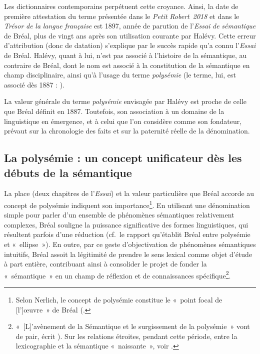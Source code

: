 \documentclass[output=paper]{langsci/langscibook}
\begin{document}
Les dictionnaires contemporains perpétuent cette croyance. Ainsi, la date de première attestation du terme présentée dans le \textit{Petit} \textit{Robert~2018} et dans le \textit{Trésor} \textit{de} \textit{la} \textit{langue} \textit{française} est 1897, année de parution de l’\textit{Essai} \textit{de} \textit{sémantique} de Bréal, plus de vingt ans après son utilisation courante par Halévy. Cette erreur d’attribution (donc de datation) s’explique par le succès rapide qu’a connu l’\textit{Essai} de Bréal. Halévy, quant à lui, n’est pas associé à l’histoire de la sémantique, au contraire de Bréal, dont le nom est associé à la constitution de la sémantique en champ disciplinaire, ainsi qu’à l’usage du terme \textit{polysémie} (le terme, lui, est associé dès 1887 : \citealt{baale_bulletin_1887}).

La valeur générale du terme \textit{polysémie} envisagée par Halévy est proche de celle que Bréal définit en 1887. Toutefois, son association à un domaine de la linguistique en émergence, et à celui que l’on considère comme son fondateur, prévaut sur la chronologie des faits et sur la paternité réelle de la dénomination.

\subsection{La polysémie : un concept unificateur dès les débuts de la sémantique}

La place (deux chapitres de l’\textit{Essai}) et la valeur particulière que Bréal accorde au concept de polysémie indiquent son importance\footnote{ \textrm{Selon Nerlich, le concept de polysémie constitue le «~point focal de [l’]œuvre~» de Bréal (\citealt[22]{nerlich_avant-propos_1993}.}}. En utilisant une dénomination simple pour parler d’un ensemble de phénomènes sémantiques relativement complexes, Bréal souligne la puissance significative des formes linguistiques, qui résultent parfois d’une réduction (cf.~le rapport qu’établit Bréal entre polysémie et «~ellipse~»). En outre, par ce geste d’objectivation de phénomènes sémantiques intuitifs, Bréal assoit la légitimité de prendre le sens lexical comme objet d’étude à part entière, contribuant ainsi à consolider le projet de fonder la «~sémantique~» en un champ de réflexion et de connaissances spécifique\footnote{ \textrm{«~[L]’avènement de la Sémantique et le surgissement de la polysémie~» vont de pair, écrit \citet[83]{delesalle_vie_1987}). Sur les relations étroites, pendant cette période, entre la lexicographie et la sémantique «~naissante~», voir \citealt{bisconti_sens_2016}.}}.
\end{document}
